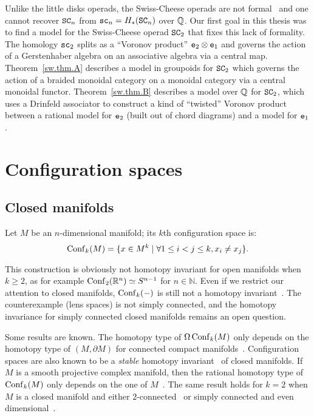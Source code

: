 Unlike the little disks operads, the Swiss-Cheese operads are not formal~\cite{Livernet2015} and one cannot recover $\SC_{n}$ from $\Sc_{n} = H_{*}(\SC_{n})$ over $\Q$.
Our first goal in this thesis was to find a model for the Swiss-Cheese operad $\SC_{2}$ that fixes this lack of formality.
The homology $\Sc_{2}$ splits as a ``Voronov product'' $\en[2] \otimes \en[1]$ and governs the action of a Gerstenhaber algebra on an associative algebra via a central map.
Theorem~\ref{sw.thm.A} describes a model in groupoids for $\SC_{2}$ which governs the action of a braided monoidal category on a monoidal category via a central monoidal functor.
Theorem~\ref{sw.thm.B} describes a model over $\Q$ for $\SC_{2}$, which uses a Drinfeld associator to construct a kind of ``twisted'' Voronov product between a rational model for $\en[2]$ (built out of chord diagrams) and a model for $\en[1]$.

\section{Configuration spaces}
\label{intro.sec.configuration-spaces}

\subsection{Closed manifolds}
\label{intro.sec.closed-manifolds}

Let $M$ be an $n$-dimensional manifold; its $k$th configuration space is:
\[ \Conf_{k}(M) = \{ x \in M^{k} \mid \forall 1 \leq i < j \leq k, x_{i} \neq x_{j} \}. \]

This construction is obviously not homotopy invariant for open manifolds when $k \geq 2$, as for example $\Conf_{2}(\R^{n}) \simeq S^{n-1}$ for $n \in \mathbb{N}$.
Even if we restrict our attention to closed manifolds, $\Conf_{k}(-)$ is still not a homotopy invariant~\cite{LongoniSalvatore2005}.
The counterexample (lens spaces) is not simply connected, and the homotopy invariance for simply connected closed manifolds remains an open question.

Some results are known.
The homotopy type of $\Omega \Conf_{k}(M)$ only depends on the homotopy type of $(M, \partial M)$ for connected compact manifolds~\cite{Levitt1995}.
Configuration spaces are also known to be a \emph{stable} homotopy invariant~\cite{AouinaKlein2004} of closed manifolds.
If $M$ is a smooth projective complex manifold, then the rational homotopy type of $\Conf_{k}(M)$ only depends on the one of $M$~\cite{Kriz1994}.
The same result holds for $k = 2$ when $M$ is a closed manifold and either $2$-connected~\cite{LambrechtsStanley2004} or simply connected and even dimensional~\cite{CordovaBulens2015}.

